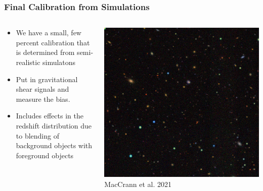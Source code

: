 \documentclass{beamer}
\begin{document}
\frame
{
    \frametitle{Final Calibration from Simulations}

    \begin{columns}
        \begin{column}{0.5\textwidth}    
            \begin{itemize}

                \item We have a small, few percent calibration that is determined
                    from semi-realistic simulatons

                \item Put in gravitational shear signals and measure the bias.

                \item Includes effects in the redshift distribution due to
                    blending of background objects with foreground objects

            \end{itemize}
        \end{column}
        \begin{column}{0.5\textwidth}
            \begin{center}
                \includegraphics[width=\textwidth]{sim.png}
                {\tiny MacCrann et al. 2021}
            \end{center}
        \end{column}
    \end{columns}


}
\end{document}

